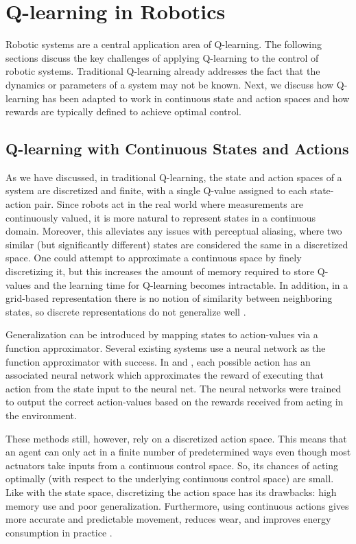\documentclass{article} %
\begin{document}
\section{Q-learning in Robotics}
Robotic systems are a central application area of Q-learning.  The following sections discuss the key challenges of applying Q-learning to the control of robotic systems.  Traditional Q-learning already addresses the fact that the dynamics or parameters of a system may not be known.  Next, we discuss how Q-learning has been adapted to work in continuous state and action spaces and how rewards are typically defined to achieve optimal control. 

\subsection{Q-learning with Continuous States and Actions}
As we have discussed, in traditional Q-learning, the state and action spaces of a system are discretized and finite, with a single Q-value assigned to each state-action pair.  Since robots act in the real world where measurements are continuously valued, it is more natural to represent states in a continuous domain.  Moreover, this alleviates any issues with perceptual aliasing, where two similar (but significantly different) states are considered the same in a discretized space.  One could attempt to approximate a continuous space by finely discretizing it, but this increases the amount of memory required to store Q-values and the learning time for Q-learning becomes intractable.  In addition, in a grid-based representation there is no notion of similarity between neighboring states, so discrete representations do not generalize well \cite{gaskett_thesis}.  

Generalization can be introduced by mapping states to action-values via a function approximator.  Several existing systems use a neural network as the function approximator \cite{lin} \cite{deep_rl} \cite{gaskett_thesis} with success. In \cite{lin} and \cite{deep_rl}, each possible action has an associated neural network which approximates the reward of executing that action from the state input to the neural net.  The neural networks were trained to output the correct action-values based on the rewards received from acting in the environment.  

These methods still, however, rely on a discretized action space.  This means that an agent can only act in a finite number of predetermined ways even though most actuators take inputs from a continuous control space. So, its chances of acting optimally (with respect to the underlying continuous control space) are small.  Like with the state space, discretizing the action space has its drawbacks: high memory use and poor generalization.  Furthermore, using continuous actions gives more accurate and predictable movement, reduces wear, and improves energy consumption in practice \cite{gaskett_thesis}. 
\end{document}
